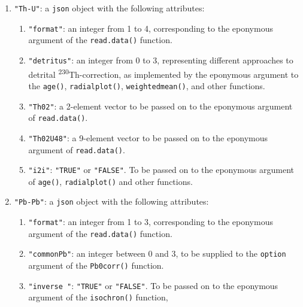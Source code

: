 \begin{refsection}
\begin{enumerate}[leftmargin=\parindent,align=left,
      labelwidth=\parindent,label*=2.\arabic*.]
\begin{enumerate}[leftmargin=\parindent,align=left,labelwidth=\parindent,label*=\arabic*.]
    \texttt{diseq()} function.
  \item{\tt "RaU"}: two-element vector containing the arguments
    \texttt{x} and \texttt{option} of the eponymous argument to the
    \texttt{diseq()} function.
  \item{\tt "PaU"}: two-element vector containing the arguments
    \texttt{x} and \texttt{option} of the eponymous argument to the
    \texttt{diseq()} function.
  \end{enumerate}
\item{\tt "Th-U"}: a \texttt{json} object with the following
  attributes:
  \begin{enumerate}[leftmargin=\parindent,align=left,labelwidth=\parindent,label*=\arabic*.]
  \item{\tt "format"}: an integer from 1 to 4, corresponding to the
    eponymous argument of the \texttt{read.data()} function.
  \item{\tt "detritus"}: an integer from 0 to 3, representing different
    approaches to detrital \textsuperscript{230}Th-correction, as
    implemented by the eponymous argument to the \texttt{age()},
    \texttt{radialplot()}, \texttt{weightedmean()}, and other
    functions.
  \item{\tt "Th02"}: a 2-element vector to be passed on to the
    eponymous argument of \texttt{read.data()}.
  \item{\tt "Th02U48"}: a 9-element vector to be passed on to the
    eponymous argument of \texttt{read.data()}.
  \item{\tt "i2i"}: \texttt{"TRUE"} or \texttt{"FALSE"}. To be passed
    on to the eponymous argument of \texttt{age()},
    \texttt{radialplot()} and other functions.
  \end{enumerate}
\item{\tt "Pb-Pb"}: a \texttt{json} object with the following
  attributes:
  \begin{enumerate}[leftmargin=\parindent,align=left,labelwidth=\parindent,label*=\arabic*.]
  \item{\tt "format"}: an integer from 1 to 3, corresponding to the
    eponymous argument of the \texttt{read.data()} function.
  \item{\tt "commonPb"}: an integer between 0 and 3, to be supplied to
    the \texttt{option} argument of the \texttt{Pb0corr()} function.
  \item{\tt "inverse "}: \texttt{"TRUE"} or \texttt{"FALSE"}. To be
    passed on to the eponymous argument of the \texttt{isochron()}
    function,
  \end{enumerate}

\end{enumerate}
\end{refsection}

